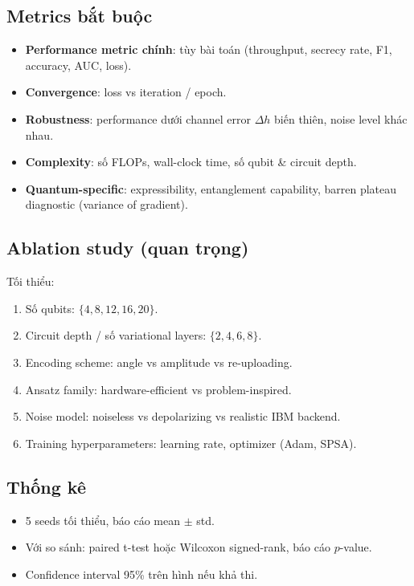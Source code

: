 \documentclass[11pt,a4paper]{article}
\begin{document}
\subsection{Metrics bắt buộc}

\begin{itemize}
  \item \textbf{Performance metric chính}: tùy bài toán (throughput, secrecy rate, F1, accuracy, AUC, loss).
  \item \textbf{Convergence}: loss vs iteration / epoch.
  \item \textbf{Robustness}: performance dưới channel error $\Delta h$ biến thiên, noise level khác nhau.
  \item \textbf{Complexity}: số FLOPs, wall-clock time, số qubit \& circuit depth.
  \item \textbf{Quantum-specific}: expressibility, entanglement capability, barren plateau diagnostic (variance of gradient).
\end{itemize}

\subsection{Ablation study (quan trọng)}
\label{subsec:ablation}

Tối thiểu:
\begin{enumerate}
  \item Số qubits: $\{4, 8, 12, 16, 20\}$.
  \item Circuit depth / số variational layers: $\{2, 4, 6, 8\}$.
  \item Encoding scheme: angle vs amplitude vs re-uploading.
  \item Ansatz family: hardware-efficient vs problem-inspired.
  \item Noise model: noiseless vs depolarizing vs realistic IBM backend.
  \item Training hyperparameters: learning rate, optimizer (Adam, SPSA).
\end{enumerate}

\subsection{Thống kê}

\begin{itemize}
  \item 5 seeds tối thiểu, báo cáo mean $\pm$ std.
  \item Với so sánh: paired t-test hoặc Wilcoxon signed-rank, báo cáo $p$-value.
  \item Confidence interval 95\% trên hình nếu khả thi.
\end{itemize}
\end{document}
